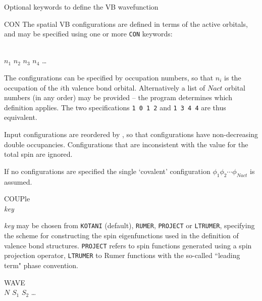 Optional keywords to define the VB wavefunction
\begin{keywordlist}
\item[CON]
The spatial
VB configurations are defined in terms of the active orbitals, and may be
specified using one or more {\tt CON} keywords:

\\
$n_1$ $n_2$ $n_3$ $n_4$ \ldots
{}

The configurations can be specified by occupation numbers, so that
$n_i$ is the occupation of the $i$th valence bond orbital. Alternatively a list of
$Nact$ orbital numbers (in any order) may be provided -- the
program determines which definition applies. The two specifications {\tt 1 0 1 2}
and {\tt 1 3 4 4} are thus equivalent.

Input configurations are reordered by , so that configurations have
non-decreasing double occupancies. Configurations that are inconsistent with the
value for the total spin are ignored.

If no configurations are specified the single `covalent' configuration
$\phi_1\phi_2\cdots\phi_{Nact}$ is assumed.
\item[COUPle]
\\
{\em key}

{\em key\/} may be chosen from {\tt KOTANI} (default), {\tt RUMER}, {\tt PROJECT} or {\tt LTRUMER},
specifying the scheme for constructing the
spin eigenfunctions used in the definition of valence bond structures. {\tt PROJECT}
refers to spin functions generated using a spin projection operator, {\tt LTRUMER} to
Rumer functions with the so-called ``leading term" phase convention.
\item[WAVE]
\\
$N$ $S_1$ $S_2$ \ldots
{}


\end{keywordlist}

